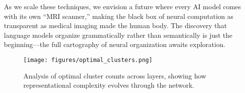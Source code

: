 As we scale these techniques, we envision a future where every AI model comes with its own ``MRI scanner,'' making the black box of neural computation as transparent as medical imaging made the human body. The discovery that language models organize grammatically rather than semantically is just the beginning—the full cartography of neural organization awaits exploration.

\begin{figure}[ht]
    \centering
    \texttt{[image: figures/optimal\_clusters.png]}
    \caption{Analysis of optimal cluster counts across layers, showing how representational complexity evolves through the network.}
    \label{fig:optimal_clusters}
\end{figure}